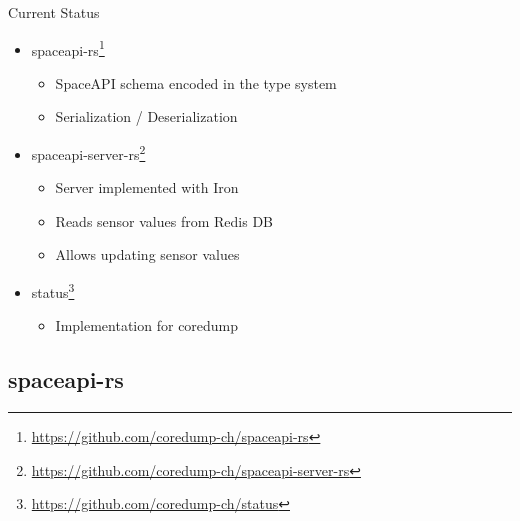 \begin{frame}[c]{Current Status}
    \begin{itemize}
        \item spaceapi-rs\footnote{\url{https://github.com/coredump-ch/spaceapi-rs}}
            \begin{itemize}
                \item SpaceAPI schema encoded in the type system
                \item Serialization / Deserialization
            \end{itemize}
        \item spaceapi-server-rs\footnote{\url{https://github.com/coredump-ch/spaceapi-server-rs}}
            \begin{itemize}
                \item Server implemented with Iron
                \item Reads sensor values from Redis DB
                \item Allows updating sensor values
            \end{itemize}
        \item status\footnote{\url{https://github.com/coredump-ch/status}}
            \begin{itemize}
                \item Implementation for coredump
            \end{itemize}
    \end{itemize}
\end{frame}

\subsection{spaceapi-rs}


